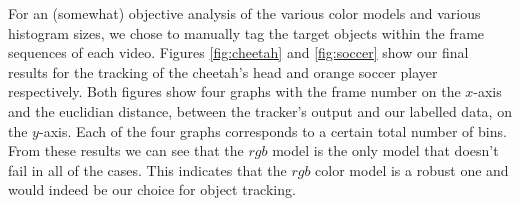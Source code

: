 \documentclass[11pt]{article}
\begin{document}
For an (somewhat) objective analysis of the various color models and various
histogram sizes, we chose to manually tag the target objects within the frame
sequences of each video. Figures \ref{fig:cheetah} and \ref{fig:soccer} show
our final results for the tracking of the cheetah's head and orange soccer
player respectively.  
Both figures show four graphs with the frame number on the $x$-axis and the
euclidian distance, between the tracker's output and our labelled data, on the
$y$-axis. Each of the four graphs corresponds to a certain total number of
bins. From these results we can see that the $rgb$ model is the only model that
doesn't fail in all of the cases. This indicates that the $rgb$ color model is a
robust one and would indeed be our choice for object tracking.
\begin{figure}[!ht]
\centering
{}
\\
\end{figure}
\end{document}
